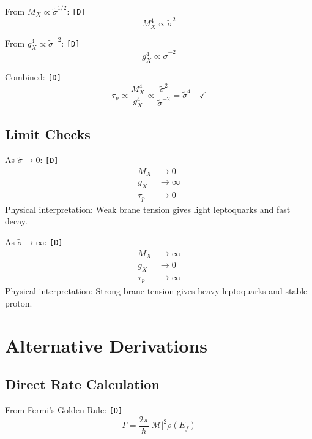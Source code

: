 \documentclass[11pt,a4paper]{article}
\newcommand{\tagD}{\textcolor{green!50!black}{\texttt{[D]}}}
\theoremstyle{definition}
\begin{document}
From $M_X \propto \tilde{\sigma}^{1/2}$: \tagD{}
\begin{equation}
\label{eq:mx-scaling}
M_X^4 \propto \tilde{\sigma}^2
\end{equation}

From $g_X^4 \propto \tilde{\sigma}^{-2}$: \tagD{}
\begin{equation}
\label{eq:gx-scaling}
g_X^4 \propto \tilde{\sigma}^{-2}
\end{equation}

Combined: \tagD{}
\begin{equation}
\label{eq:combined-scaling}
\tau_p \propto \frac{M_X^4}{g_X^4} \propto \frac{\tilde{\sigma}^2}{\tilde{\sigma}^{-2}} = \tilde{\sigma}^4 \quad \checkmark
\end{equation}

\subsection{Limit Checks}
\label{app:limits}

As $\tilde{\sigma} \to 0$: \tagD{}
\begin{align}
\label{eq:limit-mx-0}
M_X &\to 0 \\
\label{eq:limit-gx-0}
g_X &\to \infty \\
\label{eq:limit-taup-0}
\tau_p &\to 0
\end{align}
Physical interpretation: Weak brane tension gives light leptoquarks and fast decay.

As $\tilde{\sigma} \to \infty$: \tagD{}
\begin{align}
\label{eq:limit-mx-inf}
M_X &\to \infty \\
\label{eq:limit-gx-inf}
g_X &\to 0 \\
\label{eq:limit-taup-inf}
\tau_p &\to \infty
\end{align}
Physical interpretation: Strong brane tension gives heavy leptoquarks and stable proton.

\section{Alternative Derivations}
\label{app:alternative}

\subsection{Direct Rate Calculation}
\label{app:direct-rate}

From Fermi's Golden Rule: \tagD{}
\begin{equation}
\label{eq:golden-rule}
\Gamma = \frac{2\pi}{\hbar} |\mathcal{M}|^2 \rho(E_f)
\end{equation}
\end{document}
